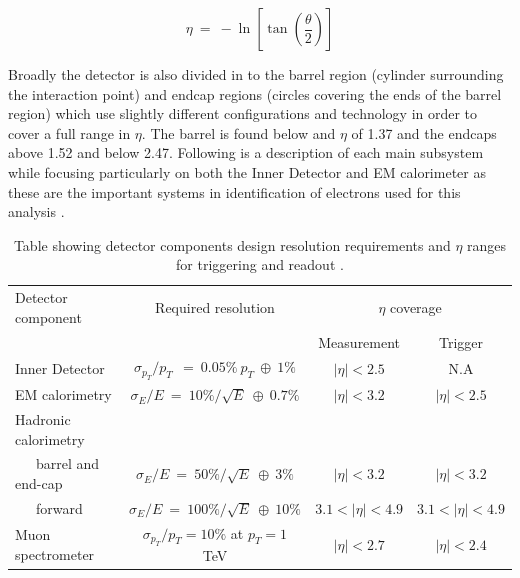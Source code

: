 	\begin{equation}
		\eta~=~-\ln[\tan(\frac{\theta}{2})]
		\label{eq:eta}
	\end{equation}

	Broadly the detector is also divided in to the barrel region (cylinder surrounding the interaction point) and endcap regions (circles covering the ends of the barrel region) which use slightly different configurations and technology in order to cover a full range in $\eta$. The barrel is found below and $\eta$ of 1.37 and the endcaps above 1.52 and below 2.47. Following is a description of each main subsystem while focusing particularly on both the Inner Detector and EM calorimeter as these are the important systems in identification of electrons used for this analysis \cite{Aad:1129811}.


	\begin {table}[h]
	\begin{center}
	\begin{tabular}{ | l | c | c | c | } 
		\hline
		Detector component & Required resolution & \multicolumn{2}{c|}{$\eta$ coverage} \\
		\cline{3-4}
		 & & Measurement & Trigger \\
    	\hline\hline
    	Inner Detector & $\sigma_{p_{T}}/p_{T}~~=~0.05\%~p_{T}~\oplus~1\%$ & $|\eta|<2.5$ & N.A \\
    	\hline
    	EM calorimetry & $\sigma_{E}/E~=~10\%/\sqrt{E}~\oplus~0.7\%$ & $|\eta|<3.2$ & $|\eta|<2.5$ \\
    	\hline
    	Hadronic calorimetry &  &  &  \\
    	~~~barrel and end-cap & $\sigma_{E}/E~=~50\%/\sqrt{E}~\oplus~3\%$ & $|\eta|<3.2$ & $|\eta|<3.2$ \\
    	~~~forward  & $\sigma_{E}/E~=~100\%/\sqrt{E}~\oplus~10\%$ & $3.1<|\eta|<4.9$ & $3.1<|\eta|<4.9$ \\
    	\hline
    	Muon spectrometer & $\sigma_{p_{T}}/p_{T} =10\%$ at $p_{T} = 1$ TeV & $|\eta|<2.7$ & $|\eta|<2.4$ \\
    	\hline
  	\end{tabular}
  	\label{tab:det_res}
  	\caption{Table showing detector components design resolution requirements and $\eta$ ranges for triggering and readout \cite{Aad:1129811}.}
  	\end{center}
	\end {table}




